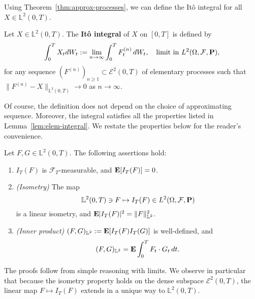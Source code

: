 Using Theorem~\ref{thm:approx-processes}, we can define the It\^{o} integral for all $X\in\mathbb{L}^2(0,T)$.
\begin{definition}
    Let $X\in\mathbb{L}^2(0,T)$. The \textbf{It\^{o} integral} of $X$ on $[0,T]$ is defined by
    \begin{equation}
        \int_0^T X_t dW_t := \lim_{n\to\infty}\int_0^T F^{(n)}_t\,dW_t, \quad\text{limit in }L^2(\Omega,\mathcal{F},\mathbf{P}),
    \end{equation}
    for any sequence $(F^{(n)})_{n\ge 1}\subset\mathcal{E}^2(0,T)$ of elementary processes such that $\|F^{(n)}-X\|_{\mathbb{L}^2(0,T)}\to 0$ as $n\to\infty$.
\end{definition}
Of course, the definition does not depend on the choice of approximating sequence. Moreover, the integral satisfies all the properties listed in Lemma~\ref{lem:elem-integral}. We restate the properties below for the reader's convenience.
\begin{proposition}
\label{prop:ito-integral}
    Let $F, G\in\mathbb{L}^2(0,T)$. The following assertions hold:
    \begin{enumerate}[\upshape (i)]
        \item $I_T(F)$ is $\mathcal{F}_T$-measurable, and $\mathbf{E}[I_T(F)]=0$.
        \item \emph{(Isometry)} The map
        \begin{equation*}
            \mathbb{L}^2(0,T)\ni F \mapsto I_T(F) \in L^2(\Omega,\mathcal{F},\mathbf{P})
        \end{equation*}
        is a linear isometry, and $\mathbf{E}|I_T(F)|^2 = \|F\|^2_{\mathbb{L}^2}$.
        \item \emph{(Inner product)} $(F,G)_{\mathbb{L}^2}:= \mathbf{E}[I_T(F) I_T(G)]$ is well-defined, and
        \begin{equation*}
            (F,G)_{\mathbb{L}^2} = \mathbf{E}\int_0^T F_t\cdot G_t \,dt.
        \end{equation*}
    \end{enumerate}
\end{proposition}

The proofs follow from simple reasoning with limits. We observe in particular that because the isometry property holds on the dense subspace $\mathcal{E}^2(0,T)$, the linear map $F\mapsto I_T(F)$ extends in a unique way to $\mathbb{L}^2(0,T)$.

